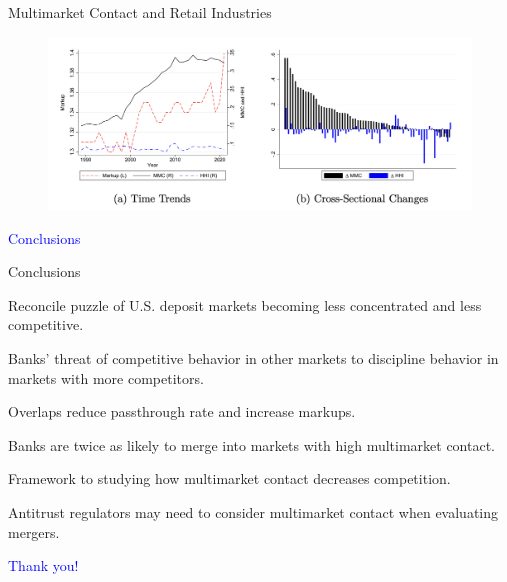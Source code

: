 \documentclass[notes,10.2pt, aspectratio=169]{beamer}
\newenvironment{wideitemize}{\itemize\addtolength{\itemsep}{10pt}}{\enditemize}
\begin{document}
\begin{frame}{Multimarket Contact and Retail Industries}

  \begin{figure}[t*]
    \centering
    \includegraphics[width=.9\textwidth]{./imgs/figure4.png}
  \end{figure}
  
\end{frame}

      \begin{frame}[noframenumbering]
        \textcolor{blue}{\huge{\centerline{Conclusions}}}
    \end{frame}
    

      \begin{frame}{Conclusions}
        \vspace{0.5cm}
        \begin{wideitemize}
        \item Reconcile puzzle of U.S. deposit markets becoming less concentrated and less competitive. 
    \begin{wideitemize}
      \vspace{0.2cm}
        \item Banks' threat of competitive behavior in other markets to discipline behavior in markets with more competitors. 
        \item Overlaps reduce passthrough rate and increase markups. 
        \item Banks are twice as likely to merge into markets with high multimarket contact. 
 \end{wideitemize}

 \item Framework to studying how multimarket contact decreases competition.

        \item Antitrust regulators may need to consider multimarket contact when evaluating mergers.
      \end{wideitemize}
          
\end{frame}

\begin{frame}[noframenumbering]
\textcolor{blue}{\huge{\centerline{Thank you!}}}
\end{frame}

%    
%    


\end{document}
